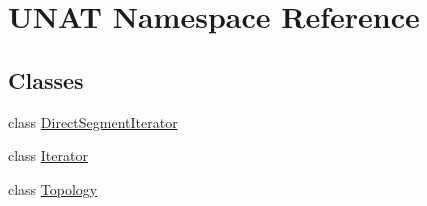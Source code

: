 \hypertarget{namespaceUNAT}{}\section{U\+N\+AT Namespace Reference}
\label{namespaceUNAT}
\subsection*{Classes}
\begin{DoxyCompactItemize}
\item 
class \mbox{\hyperlink{classUNAT_1_1DirectSegmentIterator}{Direct\+Segment\+Iterator}}
\item 
class \mbox{\hyperlink{classUNAT_1_1Iterator}{Iterator}}
\item 
class \mbox{\hyperlink{classUNAT_1_1Topology}{Topology}}
\end{DoxyCompactItemize}
